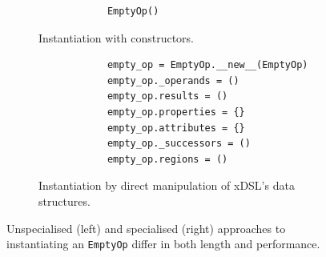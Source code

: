 \begin{figure}[H]
    \begin{subfigure}[b]{0.5\textwidth}
       \centering
        \begin{verbatim}
            EmptyOp()
        \end{verbatim}
        \footnotesize\vspace{4em}
        \caption{Instantiation with constructors.}
        \vspace{1em}
        \label{listing:ubenchmark-xdsl-constant-constructor}
    \end{subfigure}
    \hfill
    \begin{subfigure}[b]{0.5\textwidth}
        \centering
        \begin{verbatim}
            empty_op = EmptyOp.__new__(EmptyOp)
            empty_op._operands = ()
            empty_op.results = ()
            empty_op.properties = {}
            empty_op.attributes = {}
            empty_op._successors = ()
            empty_op.regions = ()
        \end{verbatim}
        \caption{Instantiation by direct manipulation of xDSL's data structures.}
        \label{listing:ubenchmark-xdsl-constant-direct}
    \end{subfigure}
    \captionsetup{name=Listing}
    \caption{Unspecialised (left) and specialised (right) approaches to instantiating an \texttt{EmptyOp} differ in both length and performance.}
    \label{listing:ubenchmark-xdsl-constant}
\end{figure}

